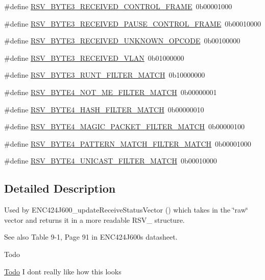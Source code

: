 \begin{DoxyCompactItemize}
\item 
\#define \mbox{\hyperlink{group__rsv_bits_ga38e402fa239e391e46b28b5c6681dfe9}{R\+S\+V\+\_\+\+B\+Y\+T\+E3\+\_\+\+R\+E\+C\+E\+I\+V\+E\+D\+\_\+\+C\+O\+N\+T\+R\+O\+L\+\_\+\+F\+R\+A\+ME}}~0b00001000
\item 
\#define \mbox{\hyperlink{group__rsv_bits_ga79ecf389081d30616847cae6cb5b7a62}{R\+S\+V\+\_\+\+B\+Y\+T\+E3\+\_\+\+R\+E\+C\+E\+I\+V\+E\+D\+\_\+\+P\+A\+U\+S\+E\+\_\+\+C\+O\+N\+T\+R\+O\+L\+\_\+\+F\+R\+A\+ME}}~0b00010000
\item 
\#define \mbox{\hyperlink{group__rsv_bits_ga1d598b4ddbd78ad09795a0f02845c85f}{R\+S\+V\+\_\+\+B\+Y\+T\+E3\+\_\+\+R\+E\+C\+E\+I\+V\+E\+D\+\_\+\+U\+N\+K\+N\+O\+W\+N\+\_\+\+O\+P\+C\+O\+DE}}~0b00100000
\item 
\#define \mbox{\hyperlink{group__rsv_bits_gaa1c5e51e1fc7daa0180df5af3294177f}{R\+S\+V\+\_\+\+B\+Y\+T\+E3\+\_\+\+R\+E\+C\+E\+I\+V\+E\+D\+\_\+\+V\+L\+AN}}~0b01000000
\item 
\#define \mbox{\hyperlink{group__rsv_bits_gaf4ae3b272d5eb92f8d38f183846445b3}{R\+S\+V\+\_\+\+B\+Y\+T\+E3\+\_\+\+R\+U\+N\+T\+\_\+\+F\+I\+L\+T\+E\+R\+\_\+\+M\+A\+T\+CH}}~0b10000000
\item 
\#define \mbox{\hyperlink{group__rsv_bits_ga27160ef6ffdcaa803c8ca26cb1c95499}{R\+S\+V\+\_\+\+B\+Y\+T\+E4\+\_\+\+N\+O\+T\+\_\+\+M\+E\+\_\+\+F\+I\+L\+T\+E\+R\+\_\+\+M\+A\+T\+CH}}~0b00000001
\item 
\#define \mbox{\hyperlink{group__rsv_bits_ga68476e62976ec265592a312ba2aefab1}{R\+S\+V\+\_\+\+B\+Y\+T\+E4\+\_\+\+H\+A\+S\+H\+\_\+\+F\+I\+L\+T\+E\+R\+\_\+\+M\+A\+T\+CH}}~0b00000010
\item 
\#define \mbox{\hyperlink{group__rsv_bits_ga8fc9b8804e9cb35a7c8ae4b5bc5065c1}{R\+S\+V\+\_\+\+B\+Y\+T\+E4\+\_\+\+M\+A\+G\+I\+C\+\_\+\+P\+A\+C\+K\+E\+T\+\_\+\+F\+I\+L\+T\+E\+R\+\_\+\+M\+A\+T\+CH}}~0b00000100
\item 
\#define \mbox{\hyperlink{group__rsv_bits_ga81251d8615bd5ed24a75cc03a4803e3f}{R\+S\+V\+\_\+\+B\+Y\+T\+E4\+\_\+\+P\+A\+T\+T\+E\+R\+N\+\_\+\+M\+A\+T\+C\+H\+\_\+\+F\+I\+L\+T\+E\+R\+\_\+\+M\+A\+T\+CH}}~0b00001000
\item 
\#define \mbox{\hyperlink{group__rsv_bits_gab864c929aa2a7b2423d54ff554356355}{R\+S\+V\+\_\+\+B\+Y\+T\+E4\+\_\+\+U\+N\+I\+C\+A\+S\+T\+\_\+\+F\+I\+L\+T\+E\+R\+\_\+\+M\+A\+T\+CH}}~0b00010000
\end{DoxyCompactItemize}


\subsection{Detailed Description}
Used by E\+N\+C424\+J600\+\_\+update\+Receive\+Status\+Vector () which takes in the \char`\"{}raw\char`\"{} vector and returns it in a more readable R\+S\+V\+\_\+ structure. \begin{DoxySeeAlso}{See also}
Table 9-\/1, Page 91 in E\+N\+C424\+J600\textquotesingle{}s datasheet. 
\end{DoxySeeAlso}
\begin{DoxyRefDesc}{Todo}
\item[\mbox{\hyperlink{todo__todo000004}{Todo}}]I don\textquotesingle{}t really like how this looks\end{DoxyRefDesc}


